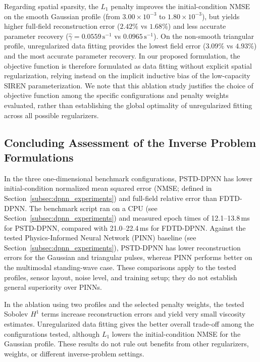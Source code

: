 \documentclass{Configuration_Files/PoliMi3i_thesis}
\newif\ifshowthesischanges
\DeclareRobustCommand{\thesischange}[2]{%
    \ifshowthesischanges
        \textcolor{#1}{#2}%
    \else
        #2%
    \fi
}
\def\thesischange#1#2{#2}%
\begin{document}
\thesischange{red}{Regarding spatial sparsity, the $L_1$ penalty improves the initial-condition NMSE on the smooth Gaussian profile (from $3.00 \times 10^{-3}$ to $1.80 \times 10^{-3}$), but yields higher full-field reconstruction error ($2.42\%$ vs $1.68\%$) and less accurate parameter recovery ($\hat{\gamma} = 0.0559\,\mathrm{s}^{-1}$ vs $0.0965\,\mathrm{s}^{-1}$). On the non-smooth triangular profile, unregularized data fitting provides the lowest field error ($3.09\%$ vs $4.93\%$) and the most accurate parameter recovery. In our proposed formulation, the objective function is therefore formulated as data fitting without explicit spatial regularization, relying instead on the implicit inductive bias of the low-capacity SIREN parameterization. We note that this ablation study justifies the choice of objective function among the specific configurations and penalty weights evaluated, rather than establishing the global optimality of unregularized fitting across all possible regularizers.}

\subsection{\thesischange{red}{Concluding Assessment of the Inverse Problem Formulations}}
\label{subsec:dpnn_conclusions}

\thesischange{red}{In the three one-dimensional benchmark configurations, PSTD-DPNN has lower initial-condition normalized mean squared error (NMSE; defined in Section~\ref{subsec:dpnn_experiments}) and full-field relative error than FDTD-DPNN. The benchmark script ran on a CPU (see Section~\ref{subsec:dpnn_experiments}) and measured epoch times of 12.1--13.8\,ms for PSTD-DPNN, compared with 21.0--22.4\,ms for FDTD-DPNN. Against the tested Physics-Informed Neural Network (PINN) baseline (see Section~\ref{subsec:dpnn_experiments}), PSTD-DPNN has lower reconstruction errors for the Gaussian and triangular pulses, whereas PINN performs better on the multimodal standing-wave case. These comparisons apply to the tested profiles, sensor layout, noise level, and training setup; they do not establish general superiority over PINNs.}

\thesischange{red}{In the ablation using two profiles and the selected penalty weights, the tested Sobolev $H^1$ terms increase reconstruction errors and yield very small viscosity estimates. Unregularized data fitting gives the better overall trade-off among the configurations tested, although $L_1$ lowers the initial-condition NMSE for the Gaussian profile. These results do not rule out benefits from other regularizers, weights, or different inverse-problem settings.}
\end{document}
